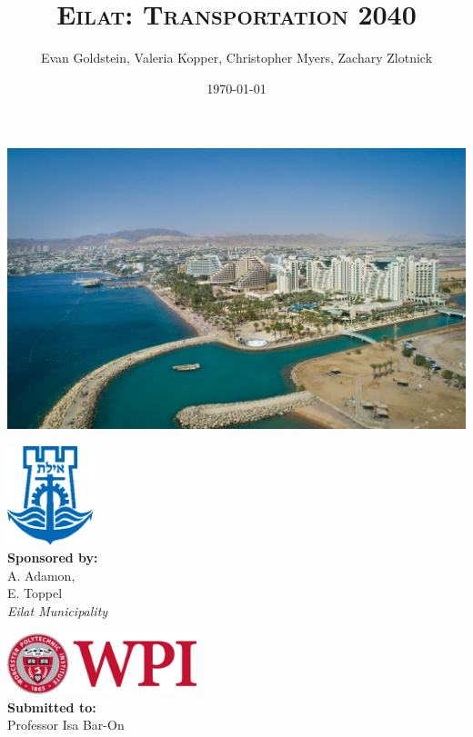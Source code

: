 \documentclass[12pt]{article}                               %
\title{\scshape Eilat: Transportation 2040}
\author{Evan Goldstein, Valeria Kopper, Christopher Myers, Zachary Zlotnick}
\date{\today}
\begin{document}
\maketitle

\begin{center}
    \includegraphics[width=1\columnwidth]{images/eilat.jpg}
\end{center}
\vspace{1cm}

\begin{minipage}{0.45\textwidth}
    \begin{flushleft} \large
        \includegraphics[width=2.5cm]{images/eilat_logo.png} \\
        \textbf{Sponsored by:} \\
        A. Adamon, \\
        E. Toppel \\
        \textit{Eilat Municipality}
    \end{flushleft}
\end{minipage}
\begin{minipage}{0.45\textwidth}
    \begin{flushright} \large
        \includegraphics[width=5.5cm]{images/WPI_logo.png} \\
        \vspace{1.0cm}
        \textbf{Submitted to:}\\
        Professor Isa Bar-On
        \vspace{1.5cm}
    \end{flushright}
\end{minipage}
\newpage
\end{document}
